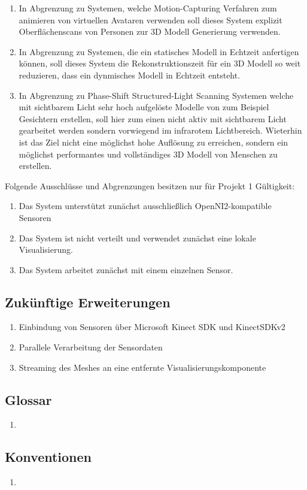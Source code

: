 \begin{enumerate}
	\item In Abgrenzung zu Systemen, welche Motion-Capturing Verfahren zum animieren von virtuellen Avataren verwenden soll dieses System explizit Oberflächenscans von Personen zur 3D Modell Generierung verwenden.
	\item In Abgrenzung zu Systemen, die ein statisches Modell in Echtzeit anfertigen können, soll dieses System die Rekonstruktionszeit für ein 3D Modell so weit reduzieren, dass ein dynmisches Modell in Echtzeit entsteht.
	\item In Abgrenzung zu Phase-Shift Structured-Light Scanning Systemen welche mit sichtbarem Licht sehr hoch aufgelöste Modelle von zum Beispiel Gesichtern erstellen, soll hier zum einen nicht aktiv mit sichtbarem Licht gearbeitet werden sondern vorwiegend im infrarotem Lichtbereich. Wieterhin ist das Ziel nicht eine möglichst hohe Auflösung zu erreichen, sondern ein möglichst performantes und vollständiges 3D Modell von Menschen zu erstellen.
\end{enumerate}

Folgende Ausschlüsse und Abgrenzungen besitzen nur für Projekt 1 Gültigkeit:

\begin{enumerate}
	\item Das System unterstützt zunächst ausschließlich OpenNI2-kompatible Sensoren
	\item Das System ist nicht verteilt und verwendet zunächst eine lokale Visualisierung.
	\item Das System arbeitet zunächst mit einem einzelnen Sensor.
\end{enumerate}

\subsection{Zukünftige Erweiterungen}

\begin{enumerate}
	\item Einbindung von Sensoren über Microsoft Kinect SDK und KinectSDKv2
	\item Parallele Verarbeitung der Sensordaten
	\item Streaming des Meshes an eine entfernte Visualisierungskomponente 
\end{enumerate}

\subsection{Glossar}

\begin{enumerate}
	\item
\end{enumerate}

\subsection{Konventionen}

\begin{enumerate}
	\item
\end{enumerate}